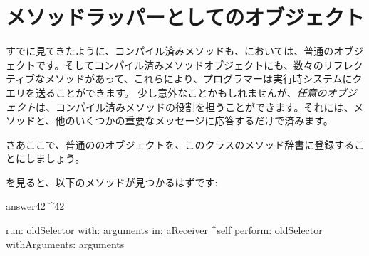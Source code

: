 \documentclass[a4paper,10pt,twoside]{book}
\begin{document}
\section{メソッドラッパーとしてのオブジェクト}

すでに見てきたように、コンパイル済みメソッドも、\st{}においては、普通のオブジェクトです。そしてコンパイル済みメソッドオブジェクトにも、数々のリフレクティブなメソッドがあって、これらにより、プログラマーは実行時システムにクエリを送ることができます。
少し意外なことかもしれませんが、\emph{任意のオブジェクト}は、コンパイル済みメソッドの役割を担うことができます。それには、メソッドと、他のいくつかの重要なメッセージに応答するだけで済みます。%


さあここで、普通の\st{}のオブジェクトを、このクラスのメソッド辞書に登録することにしましょう。

\dothis{\lct{Demo methodDict at: \#answer42 put: ObjectsAsMethodsExample new.}を評価しましょう。
さて、もういちど\ct{Demo new answer42}.の結果をprintしてみましょう。今度は、\ct{42}が得られます。}

を見ると、以下のメソッドが見つかるはずです:
\begin{code}{}
answer42
	^42

run: oldSelector with: arguments in: aReceiver
	^self perform: oldSelector withArguments: arguments
\end{code}
\end{document}

